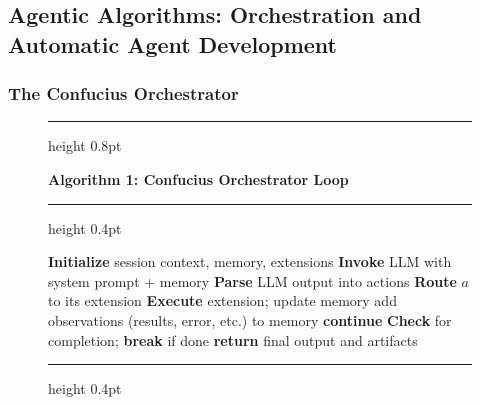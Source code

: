 \subsection{Agentic Algorithms: Orchestration and Automatic Agent Development}
\label{sec.agentic_algo}

\subsubsection{The Confucius Orchestrator}
\label{sec.orchestrator}

\begin{figure}
\vspace{-2em}
\begin{tcolorbox}[
    enhanced,
    colback=white,
    colframe=black!40,
    sharp corners,
    boxrule=0.5pt,
    left=4pt,
    right=4pt,
    top=4pt,
    bottom=4pt
]

\hrule height 0.8pt \vspace{0.3em}

\textbf{Algorithm 1: Confucius Orchestrator Loop}

\hrule height 0.4pt \vspace{0.3em}

\begin{algorithmic}[1]
    \State \textbf{Initialize} session context, memory, extensions
        \State \textbf{Invoke} LLM with system prompt + memory
        \State \textbf{Parse} LLM output into actions
            \State \textbf{Route} $a$ to its extension
            \State \textbf{Execute} extension; update memory
                \State add observations (results, error, etc.) to memory
                \State \textbf{continue}
            \EndIf
        \EndFor
        \State \textbf{Check} for completion; \textbf{break} if done
    \EndWhile
    \State \textbf{return} final output and artifacts
\end{algorithmic}

\hrule height 0.4pt

\end{tcolorbox}
\vspace{-2em}
\end{figure}

